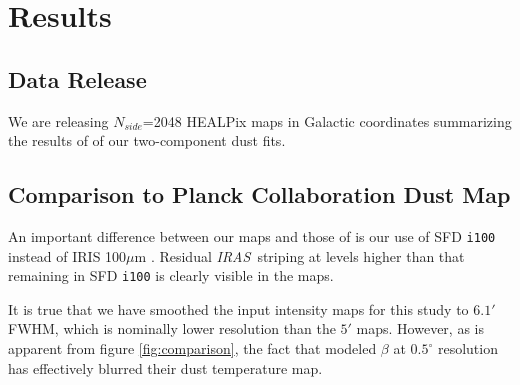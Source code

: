 \documentclass{emulateapj}
\newcommand{\IRAS}{{\it IRAS}}
\begin{document}


\section{Results}
\label{sec:results}

\subsection{Data Release}
We are releasing $N_{side}$=2048 HEALPix maps in Galactic coordinates 
summarizing the results of of our two-component dust fits.




\subsection{Comparison to Planck Collaboration Dust Map}
An important difference between our maps and those of \cite{planckdust} is our 
use of SFD \verb|i100| instead of IRIS 100$\mu$m \citep{IRIS}. Residual 
\IRAS~striping at levels higher than that remaining in SFD \verb|i100| is 
clearly visible in the \cite{planckdust} maps.

It is true that we have smoothed the input intensity maps for this study 
to $6.1'$ FWHM, which is nominally lower resolution than the $5'$ 
\cite{planckdust} maps. However, as is apparent from figure 
\ref{fig:comparison}, the fact that \cite{planckdust} modeled $\beta$ at 
$0.5^{\circ}$ resolution has effectively blurred their dust temperature map.
\end{document}
